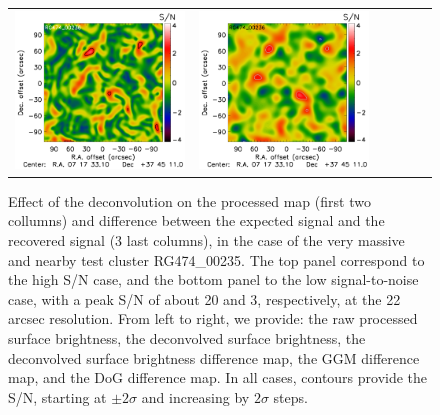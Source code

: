 \documentclass[traditabstract]{aa}
\begin{document}
\begin{figure}[h]
{\begin{tabular}{llllll}
\includegraphics[trim=2.3cm 0.7cm 0cm 0cm, clip=true, scale=1]{Figure/TFcheckGGM_RG474_00236_Ymap_zobs0p4_15_15_45.pdf} & 
\includegraphics[trim=2.3cm 0.7cm 0cm 0cm, clip=true, scale=1]{Figure/TFcheckDoG_RG474_00236_Ymap_zobs0p4_15_15_45.pdf} 
\end{tabular}}
\caption{\footnotesize{Effect of the deconvolution on the processed map (first two collumns) and difference between the expected signal and the recovered signal (3 last columns), in the case of the very massive and nearby test cluster RG474\_00235. The top panel correspond to the high S/N case, and the bottom panel to the low signal-to-noise case, with a peak S/N of about 20 and 3, respectively, at the 22 arcsec resolution. From left to right, we provide: the raw processed surface brightness, the deconvolved surface brightness, the deconvolved surface brightness difference map, the GGM difference map, and the DoG difference map. In all cases, contours provide the S/N, starting at $\pm 2 \sigma$ and increasing by $2 \sigma$ steps.}}

\end{figure}
\end{document}
